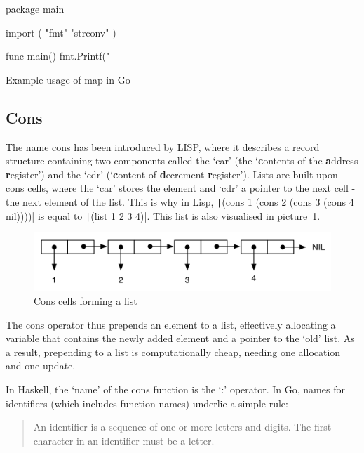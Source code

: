\begin{listing}
\begin{gocode}
package main

import (
  "fmt"
  "strconv"
)

func main() {
  fmt.Printf("%
}
\end{gocode}
\caption{Example usage of map in Go}\label{code:fmap-usage-go}
\end{listing}
\subsection{Cons}

The name cons has been introduced by LISP, where it describes a record structure
containing two components called the `car' (the `\textbf{c}ontents of the \textbf{a}ddress \textbf{r}egister')
and the `cdr' (`\textbf{c}ontent of \textbf{d}ecrement \textbf{r}egister').
Lists are built upon cons cells, where the `car' stores the element and `cdr' a
pointer to the next cell - the next element of the list.
This is why in Lisp, \texttt|(cons 1 (cons 2 (cons 3 (cons 4 nil))))| is equal to
\texttt|(list 1 2 3 4)|. This list is also visualised in picture~\ref{fig:cons}.

\begin{figure}[h!]
  \includegraphics[width=\linewidth]{../img/cons.png}
  \caption{Cons cells forming a list\autocite{cons-image-source}}
  \label{fig:cons}
\end{figure}

The cons operator thus prepends an element to a list, effectively allocating a
variable that contains the newly added element and a pointer to the `old' list.
As a result, prepending to a list is computationally cheap, needing one allocation
and one update.

In Haskell, the `name' of the cons function is the `:' operator.
In Go, names for identifiers (which includes function names) underlie a simple
rule:
\begin{quote}
    An identifier is a sequence of one or more letters and digits. The first
    character in an identifier must be a letter.\autocite{spec-identifiers}
\end{quote}

